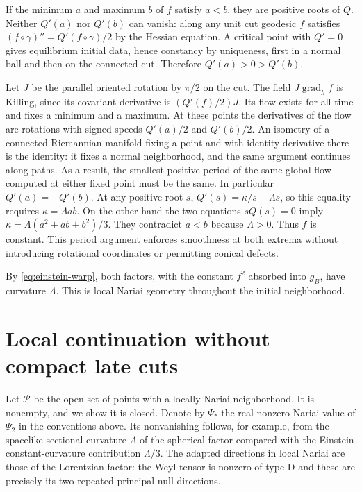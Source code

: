 \documentclass[11pt]{article}
\DeclareMathOperator{\grad}{grad}
\begin{document}
If the minimum $a$ and maximum $b$ of $f$ satisfy $a<b$, they
are positive roots of $Q$. Neither $Q'(a)$ nor $Q'(b)$ can
vanish: along any unit cut geodesic $f$ satisfies
$(f\circ\gamma)''=Q'(f\circ\gamma)/2$ by the Hessian equation.
A critical point with $Q'=0$ gives equilibrium initial data, hence
constancy by uniqueness, first in a normal ball and then on the
connected cut. Therefore $Q'(a)>0>Q'(b)$.

Let $J$ be the parallel oriented rotation by $\pi/2$ on the
cut. The field $J\grad_h f$ is Killing, since its covariant
derivative is $(Q'(f)/2)J$. Its flow exists for all time and
fixes a minimum and a maximum. At these points the derivatives of
the flow are rotations with signed speeds $Q'(a)/2$ and
$Q'(b)/2$. An isometry of a connected Riemannian manifold fixing
a point and with identity derivative there is the identity:
it fixes a normal neighborhood, and the same argument continues
along paths. As a result, the smallest positive period of the
same global flow computed at either fixed point must be the
same. In particular $Q'(a)=-Q'(b)$. At any positive root $s$,
$Q'(s)=\kappa/s-\Lambda s$, so this equality requires
$\kappa=\Lambda ab$. On the other hand the two equations
$sQ(s)=0$ imply $\kappa=\Lambda(a^2+ab+b^2)/3$. They contradict
$a<b$ because $\Lambda>0$. Thus $f$ is constant. This period
argument enforces smoothness at both extrema without introducing
rotational coordinates or permitting conical defects.

By \eqref{eq:einstein-warp}, both factors, with the constant
$f^2$ absorbed into $g_B$, have curvature $\Lambda$. This is local
Nariai geometry throughout the initial neighborhood.

\section{Local continuation without compact late cuts}

Let $\mathcal P$ be the open set of points with a locally Nariai
neighborhood. It is nonempty, and we show it is closed. Denote by
$\Psi_*$ the real nonzero Nariai value of $\Psi_2$ in the conventions
above. Its nonvanishing follows, for example, from the spacelike
sectional curvature $\Lambda$ of the spherical factor compared
with the Einstein constant-curvature contribution $\Lambda/3$.
The adapted directions in local Nariai are those of the Lorentzian
factor: the Weyl tensor is nonzero of type D and these are precisely
its two repeated principal null directions.
\end{document}
